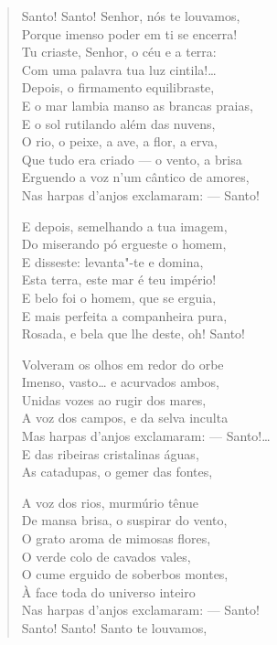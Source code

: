 \begin{verse}
Santo! Santo! Senhor, nós te louvamos,\\
Porque imenso poder em ti se encerra!\\
Tu criaste, Senhor, o céu e a terra:\\
Com uma palavra tua luz cintila!\ldots{}\\
Depois, o firmamento equilibraste,\\
E o mar lambia manso as brancas praias,\\
E o sol rutilando além das nuvens,\\
O rio, o peixe, a ave, a flor, a erva,\\
Que tudo era criado --- o vento, a brisa\\
Erguendo a voz n'um cântico de amores,\\
Nas harpas d'anjos exclamaram: --- Santo!

E depois, semelhando a tua imagem,\\
Do miserando pó ergueste o homem,\\
E disseste: levanta"-te e domina,\\
Esta terra, este mar é teu império!\\
E belo foi o homem, que se erguia,\\
E mais perfeita a companheira pura,\\
Rosada, e bela que lhe deste, oh! Santo!

Volveram os olhos em redor do orbe\\
Imenso, vasto\ldots{} e acurvados ambos,\\
Unidas vozes ao rugir dos mares,\\
A voz dos campos, e da selva inculta\\
Mas harpas d'anjos exclamaram: --- Santo!\ldots{}\\
E das ribeiras cristalinas águas,\\
As catadupas, o gemer das fontes,

A voz dos rios, murmúrio tênue\\
De mansa brisa, o suspirar do vento,\\
O grato aroma de mimosas flores,\\
O verde colo de cavados vales,\\
O cume erguido de soberbos montes,\\
À face toda do universo inteiro\\
Nas harpas d'anjos exclamaram: --- Santo!\\
Santo! Santo! Santo te louvamos,


\end{verse}
